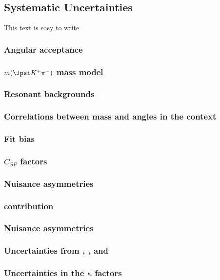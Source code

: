 \clearpage

\subsection{Systematic Uncertainties}
\label{systemics}
{\color{red} This text is easy to write}\\
\subsubsection{Angular acceptance}
\subsubsection{$m(\Jpsi K^+\pi^-)$ mass model}
\subsubsection{Resonant backgrounds}
\subsubsection{Correlations between mass and angles in the \sPlot context}
\subsubsection{Fit bias}
\subsubsection{$C_{SP}$ factors}
\subsubsection{Nuisance \CP asymmetries}
\subsubsection{\dwave contribution}
\subsubsection{Nuisance \CP asymmetries}
\subsubsection{Uncertainties from \fdfs, \BRof\BdJpsiKst, and \BRof\BsJpsiPhi}
\subsubsection{Uncertainties in the $\kappa$ factors}

